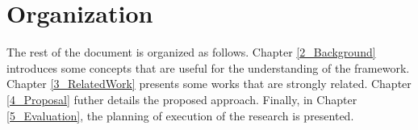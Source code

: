 \section{Organization}
The rest of the document is organized as follows. Chapter \ref{2_Background} introduces some concepts that are useful for the understanding of the framework. Chapter \ref{3_RelatedWork} presents some works that are strongly related. Chapter \ref{4_Proposal} futher details the proposed approach. Finally, in Chapter \ref{5_Evaluation}, the planning of execution of the research is presented.